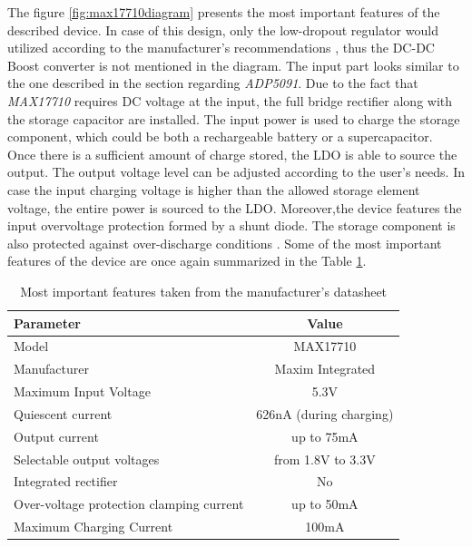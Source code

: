 \documentclass[12pt,a4paper]{article}
\begin{document}
The figure \ref{fig:max17710diagram} presents the most important features of the described device. In case of this design, only the low-dropout regulator would utilized according to the manufacturer's recommendations \cite{max17710_params}, thus the DC-DC Boost converter is not mentioned in the diagram. The input part looks similar to the one described in the section regarding \textit{ADP5091}. Due to the fact that \textit{MAX17710} requires DC voltage at the input, the full bridge rectifier  along with the storage capacitor are installed. The input power is used to charge the storage component, which could be both a rechargeable battery or a supercapacitor. Once there is a sufficient amount of charge stored, the LDO is able to source the output. The output voltage level can be adjusted according to the user's needs. In case the input charging voltage is higher than the allowed storage element voltage, the entire power is sourced to the LDO. Moreover,the device features the input overvoltage protection formed by a shunt diode. The storage component is also protected against over-discharge conditions \cite{max17710_params}. Some of the most important features  of the device are once again summarized in the Table \ref{tab:max17710_params}.

\begin{table}[ht!]
\begin{tabular}{|l|c|}
\hline
\textbf{Parameter}	& \textbf{Value} 	\\ \hline
Model  				& MAX17710       \\ \hline
Manufacturer    	& Maxim Integrated	\\ \hline
Maximum Input Voltage      &  5.3V  \\ \hline
Quiescent current     &  626nA (during charging)\\ \hline
Output current        &  up to 75mA			\\ \hline
Selectable output voltages & from 1.8V to 3.3V\\ \hline
Integrated rectifier 	&  No 		\\ \hline
Over-voltage protection clamping current & up to 50mA \\ \hline
Maximum Charging Current 	&  100mA 	\\ \hline
\end{tabular}
\caption{Most important features taken from the manufacturer's datasheet \cite{max17710_params}}
\label{tab:max17710_params}
\end{table}
\par
\end{document}
